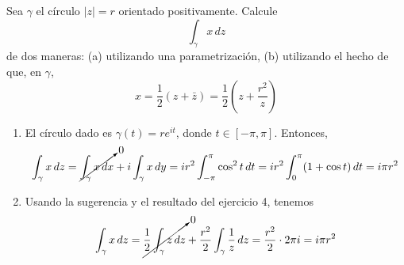 \begin{exercise}
Sea $\gamma$ el círculo $|z| = r$ orientado positivamente. Calcule
$$\int_\gamma x \, dz$$
de dos maneras: (a) utilizando una parametrización, (b) utilizando el hecho de que, en $\gamma$,
$$x = \frac 12 (z + \bar z) = \frac 12 \left( z + \frac {r^2} z \right)$$
\end{exercise}

\begin{solution}
\leavevmode
\begin{enumerate}[label=(\alph*)]
    \item El círculo dado es $\gamma(t) =re^{it}$, donde $t \in [-\pi, \pi]$. Entonces,
    $$
    \int_\gamma x \, dz
        = \cancelto 0 {\int_\gamma x \, dx} + i \int_\gamma x \, dy
        = ir^2 \int_{-\pi}^\pi \cos^2 t \, dt
        = ir^2 \int_0^\pi (1 + \cos t) \, dt
        = i\pi r^2
    $$
    
    \item Usando la sugerencia y el resultado del ejercicio 4, tenemos
    $$\int_\gamma x \, dz = \cancelto 0 {\frac 12 \int_\gamma z \, dz} + \frac {r^2} 2 \int_\gamma \frac 1z \, dz = \frac {r^2} 2 \cdot 2\pi i = i\pi r^2$$
\end{enumerate}
\end{solution}
